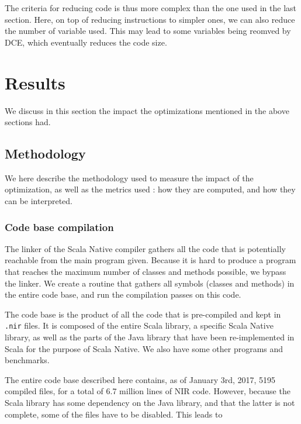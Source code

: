\documentclass[11pt,a4paper]{article}
\begin{document}
The criteria for reducing code is thus more complex than the one used in the last section. Here, on top of reducing instructions to simpler ones, we can also reduce the number of variable used. This may lead to some variables being reomved by DCE, which eventually reduces the code size. 




\section{Results}

We discuss in this section the impact the optimizations mentioned in the above sections had.

\subsection{Methodology}

We here describe the methodology used to measure the impact of the optimization, as well as the metrics used : how they are computed, and how they can be interpreted.

\subsubsection{Code base compilation}

The linker of the Scala Native compiler gathers all the code that is potentially reachable from the main program given. Because it is hard to produce a program that reaches the maximum number of classes and methods possible, we bypass the linker. We create a routine that gathers all symbols (classes and methods) in the entire code base, and run the compilation passes on this code.

The code base is the product of all the code that is pre-compiled and kept in \texttt{.nir} files. It is composed of the entire Scala library, a specific Scala Native library, as well as the parts of the Java library that have been re-implemented in Scala for the purpose of Scala Native. We also have some other programs and benchmarks.

The entire code base described here contains, as of January 3rd, 2017, 5195 compiled files, for a total of 6.7 million lines of NIR code. However, because the Scala library has some dependency on the Java library, and that the latter is not complete, some of the files have to be disabled. This leads to 
\end{document}
